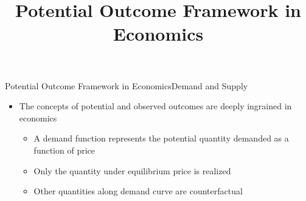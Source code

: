 \documentclass[hyperref={pdfpagelabels=false}]{beamer}
\begin{document}
\title[]  
{Potential Outcome Framework in Economics}


\author 
{}

\institute{}






\date
{}


\begin{frame}{}
	\titlepage
\end{frame}









\begin{frame}{Potential Outcome Framework in Economics}{Demand and Supply}
	
	
	\begin{itemize} 
		\item The concepts of potential and observed outcomes are deeply ingrained in economics
		\vspace{0.2cm}
		\begin{itemize} 
			\item A demand function represents the potential quantity demanded as a function of price 
			\vspace{0.2cm}
			\item Only the quantity under equilibrium price is realized 
			\vspace{0.2cm}
			\item Other quantities along demand curve are counterfactual			
			
			
			
			
		\end{itemize}
	\end{itemize}
	
\end{frame}
\end{document}
